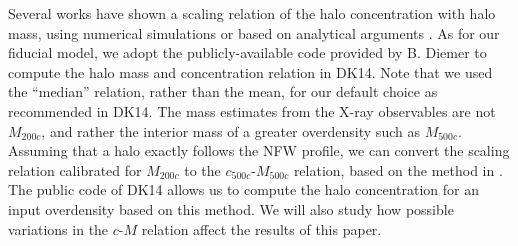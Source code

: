 \documentclass[iop, apj]{emulateapj}
\newcommand{\?}{\stackrel{?}{=}}
\begin{document}
Several works have shown a scaling relation of the halo concentration
with halo mass, using numerical simulations or based on analytical
arguments
\citep{Bullocketal:01,Wechsleretal:02,Zhaoetal:03,Duffyetal:08}
\citep[most recently][hereafter DK14 and see references
therein]{DiemerKravtsov:14}. As for our fiducial model, we adopt the
publicly-available code provided by B. Diemer to compute the halo mass
and concentration relation in DK14.  Note that we used the ``median''
relation, rather than the mean, for our default choice as recommended in
DK14.  The mass estimates from the X-ray observables are not $M_{200c}$,
and rather the interior mass of a greater overdensity such as
$M_{500c}$. Assuming that a halo exactly follows the NFW profile, we can
convert the scaling relation calibrated for $M_{200c}$ to the
$c_{500c}$-$M_{500c}$ relation, based on the method in
\citet{HuKravtsov:03}. The public code of DK14 allows us to compute the
halo concentration for an input overdensity based on this method. We
will also study how possible variations in the $c$-$M$ relation affect
the results of this paper.
\end{document}
